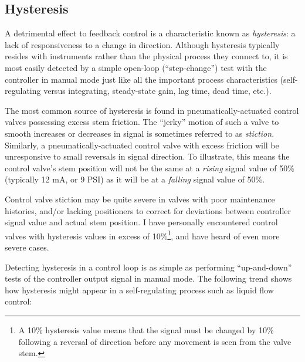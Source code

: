 







\filbreak
\subsection{Hysteresis}

A detrimental effect to feedback control is a characteristic known as \textit{hysteresis}: a lack of responsiveness to a change in direction.  Although hysteresis typically resides with instruments rather than the physical process they connect to, it is most easily detected by a simple open-loop (``step-change'') test with the controller in manual mode just like all the important process characteristics (self-regulating versus integrating, steady-state gain, lag time, dead time, etc.).  

The most common source of hysteresis is found in pneumatically-actuated control valves possessing excess stem friction.  The ``jerky'' motion of such a valve to smooth increases or decreases in signal is sometimes referred to as \textit{stiction}.  Similarly, a pneumatically-actuated control valve with excess friction will be unresponsive to small reversals in signal direction.  To illustrate, this means the control valve's stem position will not be the same at a \textit{rising} signal value of 50\% (typically 12 mA, or 9 PSI) as it will be at a \textit{falling} signal value of 50\%.

Control valve stiction may be quite severe in valves with poor maintenance histories, and/or lacking positioners to correct for deviations between controller signal value and actual stem position.  I have personally encountered control valves with hysteresis values in excess of 10\%\footnote{A 10\% hysteresis value means that the signal must be changed by 10\% following a reversal of direction before any movement is seen from the valve stem.}, and have heard of even more severe cases.

Detecting hysteresis in a control loop is as simple as performing ``up-and-down'' tests of the controller output signal in manual mode.  The following trend shows how hysteresis might appear in a self-regulating process such as liquid flow control:

